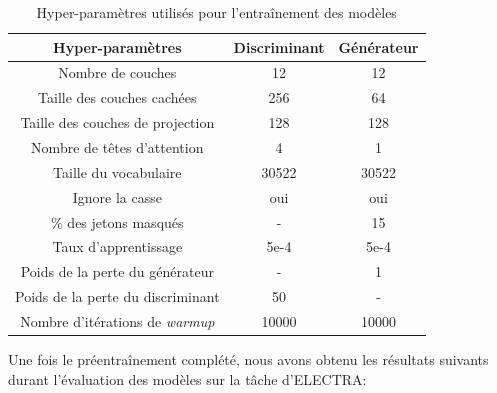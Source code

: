 \documentclass[12pt,twoside,maitrise]{dms}
\theoremstyle{definition}
\numberwithin{equation}{section}
\numberwithin{table}{chapter}
\numberwithin{figure}{chapter}
\begin{document}
\begin{table}[h!]
	\centering
	\begin{tabular}{||c | c c||}
		\hline
		Hyper-paramètres                       & Discriminant & Générateur \\ [0.5ex]
		\hline\hline
		Nombre de couches                      & 12           & 12         \\
		Taille des couches cachées             & 256          & 64         \\
		Taille des couches de projection       & 128          & 128        \\
		Nombre de têtes d'attention            & 4            & 1          \\
		Taille du vocabulaire                  & 30522        & 30522      \\
		Ignore la casse                        & oui          & oui        \\
		\% des jetons masqués                  & -            & 15         \\
		Taux d'apprentissage                   & 5e-4         & 5e-4       \\
		Poids de la perte du générateur        & -            & 1          \\
		Poids de la perte du discriminant      & 50           & -          \\
		Nombre d'itérations de \textit{warmup} & 10000        & 10000      \\
		\hline
	\end{tabular}
	\caption{Hyper-paramètres utilisés pour l'entraînement des modèles}
	\label{table:pre-entr-hp}
\end{table}

Une fois le préentraînement complété, nous avons obtenu les résultats suivants
durant l'évaluation des modèles sur la tâche d'ELECTRA:
\end{document}
